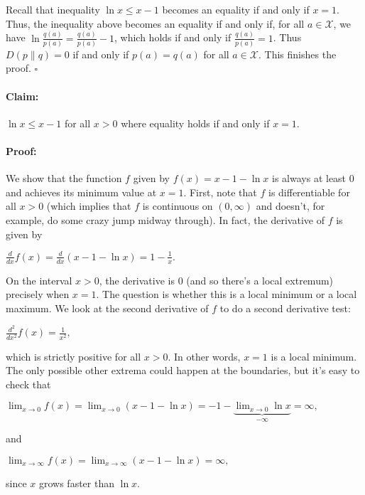 \documentclass[6008notes.tex]{subfiles}
\begin{document}
Recall that inequality $\ln x\le x-1$ becomes an equality if and only if $x=1$. Thus, the inequality above becomes an equality if and only if, for all $a\in \mathcal{X}$, we have $\ln \frac{q(a)}{p(a)}=\frac{q(a)}{p(a)}-1$, which holds if and only if $\frac{q(a)}{p(a)}=1$. Thus $D(p\parallel q)=0$ if and only if $p(a)=q(a)$ for all $a\in \mathcal{X}$. This finishes the proof. $\square$

\paragraph{Claim:} $\ln x\le x-1$ for all $x>0$ where equality holds if and only if $x=1$.

\paragraph{Proof:} We show that the function $f$ given by $f(x)=x-1-\ln x$ is always at least 0 and achieves its minimum value at $x=1$. First, note that $f$ is differentiable for all $x>0$ (which implies that $f$ is continuous on $(0,\infty)$ and doesn't, for example, do some crazy jump midway through). In fact, the derivative of $f$ is given by

{\centering$\frac{d}{dx}f(x)=\frac{d}{dx}(x-1-\ln x)=1-\frac{1}{x}.$ \par}
 
On the interval $x>0$, the derivative is 0 (and so there's a local extremum) precisely when $x=1$. The question is whether this is a local minimum or a local maximum. We look at the second derivative of $f$ to do a second derivative test:

{\centering$\frac{d^{2}}{dx^{2}}f(x)=\frac{1}{x^{2}},$ \par}

which is strictly positive for all $x>0$. In other words, $x=1$ is a local minimum. The only possible other extrema could happen at the boundaries, but it's easy to check that

{\centering$\lim _{x\rightarrow 0}f(x) = \lim _{x\rightarrow 0} (x - 1 - \ln x) = -1 - \underbrace{\lim _{x\rightarrow 0} \ln x}_{-\infty } = \infty ,$ \par}

and

{\centering$\lim _{x\rightarrow \infty }f(x) = \lim _{x\rightarrow \infty } (x - 1 - \ln x) = \infty ,$ \par}

since $x$ grows faster than $\ln x$.
\end{document}

